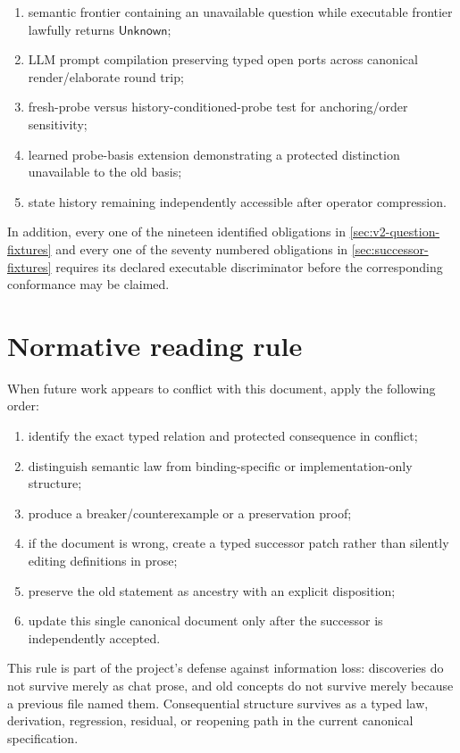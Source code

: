 \documentclass[11pt,oneside]{article}
\begin{document}
\begin{enumerate}
\item semantic frontier containing an unavailable question while executable frontier lawfully returns \(\mathsf{Unknown}\);
\item LLM prompt compilation preserving typed open ports across canonical render/elaborate round trip;
\item fresh-probe versus history-conditioned-probe test for anchoring/order sensitivity;
\item learned probe-basis extension demonstrating a protected distinction unavailable to the old basis;
\item state history remaining independently accessible after operator compression.
\end{enumerate}

In addition, every one of the nineteen identified obligations in
\cref{sec:v2-question-fixtures} and every one of the seventy numbered obligations in
\cref{sec:successor-fixtures} requires its declared executable discriminator before the
corresponding conformance may be claimed.

\section{Normative reading rule}

When future work appears to conflict with this document, apply the following order:
\begin{enumerate}
\item identify the exact typed relation and protected consequence in conflict;
\item distinguish semantic law from binding-specific or implementation-only structure;
\item produce a breaker/counterexample or a preservation proof;
\item if the document is wrong, create a typed successor patch rather than silently editing definitions in prose;
\item preserve the old statement as ancestry with an explicit disposition;
\item update this single canonical document only after the successor is independently accepted.
\end{enumerate}

This rule is part of the project's defense against information loss: discoveries do not survive merely as chat prose, and old concepts do not survive merely because a previous file named them.  Consequential structure survives as a typed law, derivation, regression, residual, or reopening path in the current canonical specification.
\end{document}
